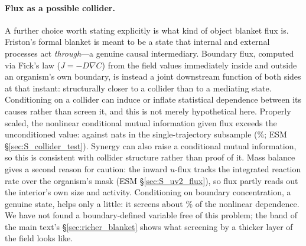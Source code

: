\documentclass[11pt]{article}
\begin{document}
\paragraph{Flux as a possible collider.} A further choice worth stating explicitly is what kind of object blanket flux is. Friston's formal blanket is meant to be a state that internal and external processes act \emph{through}---a genuine causal intermediary. Boundary flux, computed via Fick's law ($J=-D\nabla C$) from the field values immediately inside and outside an organism's own boundary, is instead a joint downstream function of both sides at that instant: structurally closer to a collider than to a mediating state. Conditioning on a collider can induce or inflate statistical dependence between its causes rather than screen it, and this is not merely hypothetical here. Properly scaled, the nonlinear conditional mutual information given flux exceeds the unconditioned value:  against  nats in the single-trajectory subsample (\%; ESM \S\ref{sec:S_collider_test}). Synergy can also raise a conditional mutual information, so this is consistent with collider structure rather than proof of it. Mass balance gives a second reason for caution: the inward $u$-flux tracks the integrated reaction rate over the organism's mask (ESM \S\ref{sec:S_uv2_flux}), so flux partly reads out the interior's own size and activity. Conditioning on boundary concentration, a genuine state, helps only a little: it screens about \% of the nonlinear dependence. We have not found a boundary-defined variable free of this problem; the band of the main text's \S\ref{sec:richer_blanket} shows what screening by a thicker layer of the field looks like.
\end{document}
